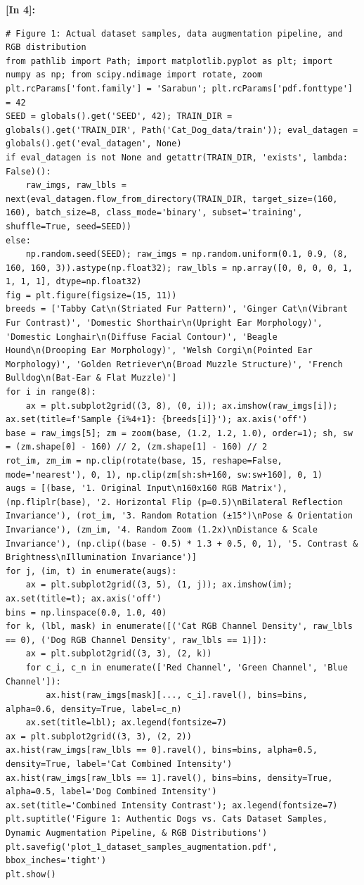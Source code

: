 \vspace{0.6em}
\noindent\textbf{\small [In 4]:}
\begin{lstlisting}[style=pycode]
# Figure 1: Actual dataset samples, data augmentation pipeline, and RGB distribution
from pathlib import Path; import matplotlib.pyplot as plt; import numpy as np; from scipy.ndimage import rotate, zoom
plt.rcParams['font.family'] = 'Sarabun'; plt.rcParams['pdf.fonttype'] = 42
SEED = globals().get('SEED', 42); TRAIN_DIR = globals().get('TRAIN_DIR', Path('Cat_Dog_data/train')); eval_datagen = globals().get('eval_datagen', None)
if eval_datagen is not None and getattr(TRAIN_DIR, 'exists', lambda: False)():
    raw_imgs, raw_lbls = next(eval_datagen.flow_from_directory(TRAIN_DIR, target_size=(160, 160), batch_size=8, class_mode='binary', subset='training', shuffle=True, seed=SEED))
else:
    np.random.seed(SEED); raw_imgs = np.random.uniform(0.1, 0.9, (8, 160, 160, 3)).astype(np.float32); raw_lbls = np.array([0, 0, 0, 0, 1, 1, 1, 1], dtype=np.float32)
fig = plt.figure(figsize=(15, 11))
breeds = ['Tabby Cat\n(Striated Fur Pattern)', 'Ginger Cat\n(Vibrant Fur Contrast)', 'Domestic Shorthair\n(Upright Ear Morphology)', 'Domestic Longhair\n(Diffuse Facial Contour)', 'Beagle Hound\n(Drooping Ear Morphology)', 'Welsh Corgi\n(Pointed Ear Morphology)', 'Golden Retriever\n(Broad Muzzle Structure)', 'French Bulldog\n(Bat-Ear & Flat Muzzle)']
for i in range(8):
    ax = plt.subplot2grid((3, 8), (0, i)); ax.imshow(raw_imgs[i]); ax.set(title=f'Sample {i%4+1}: {breeds[i]}'); ax.axis('off')
base = raw_imgs[5]; zm = zoom(base, (1.2, 1.2, 1.0), order=1); sh, sw = (zm.shape[0] - 160) // 2, (zm.shape[1] - 160) // 2
rot_im, zm_im = np.clip(rotate(base, 15, reshape=False, mode='nearest'), 0, 1), np.clip(zm[sh:sh+160, sw:sw+160], 0, 1)
augs = [(base, '1. Original Input\n160x160 RGB Matrix'), (np.fliplr(base), '2. Horizontal Flip (p=0.5)\nBilateral Reflection Invariance'), (rot_im, '3. Random Rotation (±15°)\nPose & Orientation Invariance'), (zm_im, '4. Random Zoom (1.2x)\nDistance & Scale Invariance'), (np.clip((base - 0.5) * 1.3 + 0.5, 0, 1), '5. Contrast & Brightness\nIllumination Invariance')]
for j, (im, t) in enumerate(augs):
    ax = plt.subplot2grid((3, 5), (1, j)); ax.imshow(im); ax.set(title=t); ax.axis('off')
bins = np.linspace(0.0, 1.0, 40)
for k, (lbl, mask) in enumerate([('Cat RGB Channel Density', raw_lbls == 0), ('Dog RGB Channel Density', raw_lbls == 1)]):
    ax = plt.subplot2grid((3, 3), (2, k))
    for c_i, c_n in enumerate(['Red Channel', 'Green Channel', 'Blue Channel']):
        ax.hist(raw_imgs[mask][..., c_i].ravel(), bins=bins, alpha=0.6, density=True, label=c_n)
    ax.set(title=lbl); ax.legend(fontsize=7)
ax = plt.subplot2grid((3, 3), (2, 2))
ax.hist(raw_imgs[raw_lbls == 0].ravel(), bins=bins, alpha=0.5, density=True, label='Cat Combined Intensity')
ax.hist(raw_imgs[raw_lbls == 1].ravel(), bins=bins, density=True, alpha=0.5, label='Dog Combined Intensity')
ax.set(title='Combined Intensity Contrast'); ax.legend(fontsize=7)
plt.suptitle('Figure 1: Authentic Dogs vs. Cats Dataset Samples, Dynamic Augmentation Pipeline, & RGB Distributions')
plt.savefig('plot_1_dataset_samples_augmentation.pdf', bbox_inches='tight')
plt.show()\end{lstlisting}
